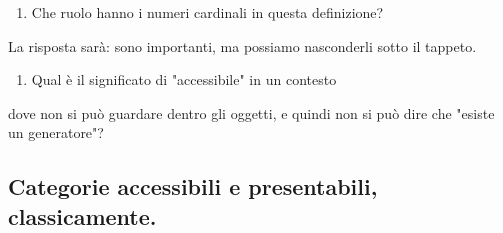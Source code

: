 \documentclass[11pt]{article}
\theoremstyle{reference}
\begin{document}
\begin{enumerate}
\item Che ruolo hanno i numeri cardinali in questa definizione?
\end{enumerate}
La risposta sarà: sono importanti, ma possiamo
nasconderli sotto il tappeto.
\begin{enumerate}
\item Qual è il significato di "accessibile" in un contesto
\end{enumerate}
dove non si può guardare dentro gli oggetti, e quindi non
si può dire che "esiste un generatore"?

\subsection{Categorie accessibili e presentabili, classicamente.}
\label{sec:org50d9e4a}
\end{document}
